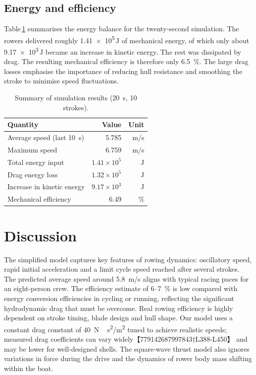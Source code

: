 \documentclass[11pt]{article}
\begin{document}
\subsection{Energy and efficiency}

Table\,\ref{tab:summary} summarises the energy balance for the twenty‑second
simulation.  The rowers delivered roughly \num{1.41e5}\,\si{J} of mechanical
energy, of which only about \num{9.17e3}\,\si{J} became an increase in
kinetic energy.  The rest was dissipated by drag.  The resulting
mechanical efficiency is therefore only \SI{6.5}{\percent}.  The large
drag losses emphasise the importance of reducing hull resistance and
smoothing the stroke to minimise speed fluctuations.

\begin{table}[h]
  \centering
  \caption{Summary of simulation results (20 s, 10 strokes).}
  \label{tab:summary}
  \begin{tabular}{@{}lrr@{}}
    \toprule
    Quantity & Value & Unit \\
    \midrule
    Average speed (last 10 s) & 5.785 & m/s \\
    Maximum speed & 6.759 & m/s \\
    Total energy input & $1.41\times 10^5$ & J \\
    Drag energy loss & $1.32\times 10^5$ & J \\
    Increase in kinetic energy & $9.17\times 10^3$ & J \\
    Mechanical efficiency & 6.49 & \% \\
    \bottomrule
  \end{tabular}
\end{table}

\section{Discussion}

The simplified model captures key features of rowing dynamics: oscillatory
speed, rapid initial acceleration and a limit cycle speed reached after
several strokes.  The predicted average speed around \SI{5.8}{m/s}
aligns with typical racing paces for an eight‑person crew.  The efficiency
estimate of 6--7 \% is low compared with energy conversion efficiencies in
cycling or running, reflecting the significant hydrodynamic drag that must
be overcome.  Real rowing efficiency is highly dependent on stroke timing,
blade design and hull shape.  Our model uses a constant drag constant of
\SI{40}{N\,s^2/m^2} tuned to achieve realistic speeds; measured drag
coefficients can vary widely【779142687997843†L388-L450】 and may be lower
for well‑designed shells.  The square‑wave thrust model also ignores
variations in force during the drive and the dynamics of rower body mass
shifting within the boat.
\end{document}
